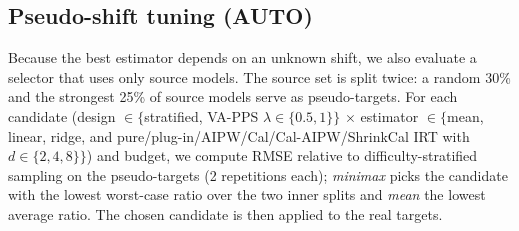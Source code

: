 \subsection{Pseudo-shift tuning (AUTO)}
Because the best estimator depends on an unknown shift, we also evaluate a selector that uses only source models. The source set is split twice: a random 30\% and the strongest 25\% of source models serve as pseudo-targets. For each candidate (design $\in\{$stratified, VA-PPS $\lambda\in\{0.5,1\}\}$ $\times$ estimator $\in\{$mean, linear, ridge, and pure/plug-in/AIPW/Cal/Cal-AIPW/ShrinkCal IRT with $d\in\{2,4,8\}\}$) and budget, we compute RMSE relative to difficulty-stratified sampling on the pseudo-targets (2 repetitions each); \emph{minimax} picks the candidate with the lowest worst-case ratio over the two inner splits and \emph{mean} the lowest average ratio. The chosen candidate is then applied to the real targets.
